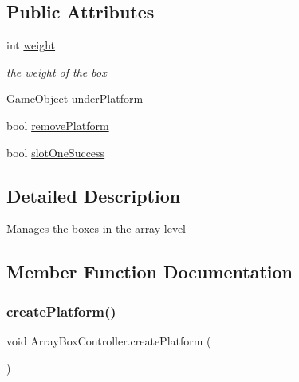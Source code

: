 \subsection*{Public Attributes}
\begin{DoxyCompactItemize}
\item 
int \hyperlink{class_array_box_controller_a0703f2b4690bc71070aa58210187a4f5}{weight}
\begin{DoxyCompactList}\small\item\em the weight of the box \end{DoxyCompactList}\item 
Game\+Object \hyperlink{class_array_box_controller_a7d14b3ed04e57ed25f856c76bc91bba3}{under\+Platform}
\item 
bool \hyperlink{class_array_box_controller_af7f266ad7922670c221e4a2247308f03}{remove\+Platform}
\item 
bool \hyperlink{class_array_box_controller_a788b69c1dd5fd14ada59788891a50ec2}{slot\+One\+Success}
\end{DoxyCompactItemize}


\subsection{Detailed Description}
Manages the boxes in the array level 

\subsection{Member Function Documentation}
\mbox{\label{class_array_box_controller_aaee7f59464d3cddf435e9669faacd8aa}} 
\subsubsection{\texorpdfstring{create\+Platform()}{createPlatform()}}
{\footnotesize\ttfamily void Array\+Box\+Controller.\+create\+Platform (\begin{DoxyParamCaption}{ }\end{DoxyParamCaption})}

\mbox{\label{class_array_box_controller_a926861290e0d8414a771456f9d573659}} 
